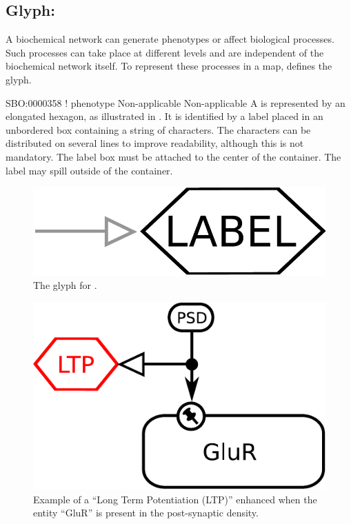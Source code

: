 %

\subsection{Glyph: }
\label{sec:phenotype}

A biochemical network can generate phenotypes or affect biological
processes.  Such processes can take place at different levels and are
independent of the biochemical network itself.  To represent these
processes in a map, \SBGNERLone defines the  glyph.

\begin{glyphDescription}

\glyphSboTerm SBO:0000358 ! phenotype
\glyphOrigin Non-applicable
\glyphTarget Non-applicable
\glyphEndPoint A  is represented by an elongated
hexagon, as illustrated in . It is identified by a label placed in an
unbordered box containing a string of characters.  The characters can be
distributed on several lines to improve readability, although this is not
mandatory.  The label box must be attached to the center of the
 container.  The label may spill outside of the container.

\end{glyphDescription}
 
\begin{figure}[H]
  \centering
  \includegraphics[scale = 0.3]{images/phenotype}
  \caption{The \ER glyph for .}
  \label{fig:phenotype}
\end{figure}

\begin{figure}[H]
  \centering
  \includegraphics[scale = 0.5]{examples/ex-phenotype}
  \caption{Example of a  ``Long Term Potentiation (LTP)'' enhanced when the entity ``GluR'' is present in the post-synaptic density.}
  \label{fig:ex-phenotype}
\end{figure}

